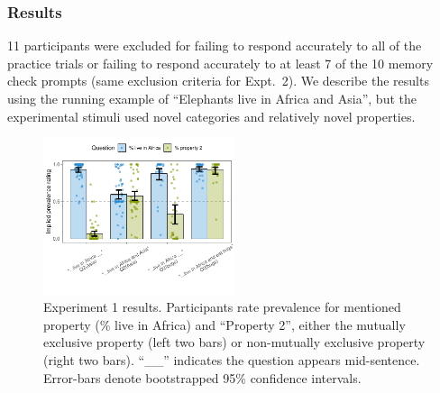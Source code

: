 \documentclass[10pt,letterpaper]{article}
\newcommand{\mh}[1]{{\textcolor{Blue}{[mh: #1]}}}
\begin{document}




\subsubsection{Results}





11 participants were excluded for failing to respond accurately to all of the practice trials or  failing to respond accurately to at least 7 of the 10 memory check prompts (same exclusion criteria for Expt.~2).
We describe the results using the running example of ``Elephants live in Africa and Asia'', but the experimental stimuli used novel categories and relatively novel properties.
 
 \begin{figure}[h]
  \centering
    \includegraphics[width=0.5\textwidth]{expt2_summary}
    \vspace{-1.2cm}
  \caption{Experiment 1 results.  Participants rate prevalence for mentioned property (\% live in Africa) and ``Property 2'', either the mutually exclusive property (left two bars) or non-mutually exclusive property (right two bars). ``\_\_'' indicates the question appears mid-sentence. Error-bars denote bootstrapped 95\% confidence intervals.}
  \label{fig:expt2}
          \vspace{-0.6cm}
  \end{figure}
 
\end{document}
